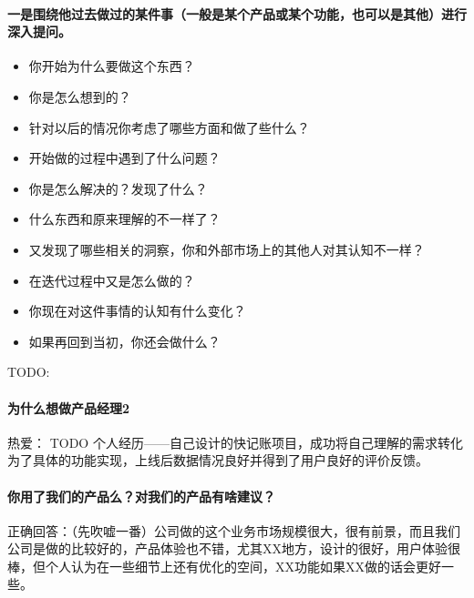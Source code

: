\documentclass[letterpaper,11pt,english]{sphinxmanual}
\begin{document}
\paragraph{一是围绕他过去做过的某件事（一般是某个产品或某个功能，也可以是其他）进行深入提问。}
\label{\detokenize{chapter_interview/question:id7}}\begin{itemize}
\item {} 
你开始为什么要做这个东西？

\item {} 
你是怎么想到的？

\item {} 
针对以后的情况你考虑了哪些方面和做了些什么？

\item {} 
开始做的过程中遇到了什么问题？

\item {} 
你是怎么解决的？发现了什么？

\item {} 
什么东西和原来理解的不一样了？

\item {} 
又发现了哪些相关的洞察，你和外部市场上的其他人对其认知不一样？

\item {} 
在迭代过程中又是怎么做的？

\item {} 
你现在对这件事情的认知有什么变化？

\item {} 
如果再回到当初，你还会做什么？

\end{itemize}

TODO: 


\paragraph{为什么想做产品经理2\sphinxfootnotemark[296]}
\label{\detokenize{chapter_interview/question:id8}}%
\begin{footnotetext}[296]\sphinxAtStartFootnote
{}
%
\end{footnotetext}\ignorespaces 
热爱： TODO
个人经历——自己设计的快记账项目，成功将自己理解的需求转化为了具体的功能实现，上线后数据情况良好并得到了用户良好的评价反馈。


\paragraph{你用了我们的产品么？对我们的产品有啥建议？}
\label{\detokenize{chapter_interview/question:id9}}
正确回答：（先吹嘘一番）公司做的这个业务市场规模很大，很有前景，而且我们公司是做的比较好的，产品体验也不错，尤其XX地方，设计的很好，用户体验很棒，但个人认为在一些细节上还有优化的空间，XX功能如果XX做的话会更好一些。
\end{document}
